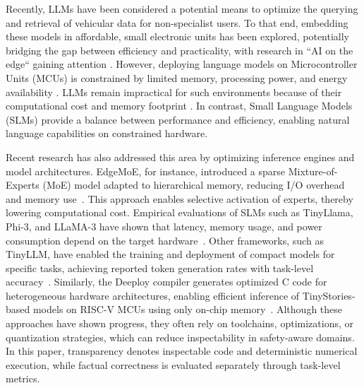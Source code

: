\documentclass{ieeeaccess}
\begin{document}
Recently, LLMs have been considered a potential means to optimize the querying and retrieval of vehicular data for non-specialist users. To that end, embedding these models in affordable, small electronic units has been explored, potentially bridging the gap between efficiency and practicality, with research in ``AI on the edge`` gaining attention \cite{iiot}. However, deploying language models on Microcontroller Units (MCUs) is constrained by limited memory, processing power, and energy availability \cite{wu2021tiny}. LLMs remain impractical for such environments because of their computational cost and memory footprint \cite{strubell2019energy}. In contrast, Small Language Models (SLMs) provide a balance between performance and efficiency, enabling natural language capabilities on constrained hardware.

Recent research has also addressed this area by optimizing inference engines and model architectures. EdgeMoE, for instance, introduced a sparse Mixture-of-Experts (MoE) model adapted to hierarchical memory, reducing I/O overhead and memory use~\cite{yi2025edgemoe}. This approach enables selective activation of experts, thereby lowering computational cost. Empirical evaluations of SLMs such as TinyLlama, Phi-3, and LLaMA-3 have shown that latency, memory usage, and power consumption depend on the target hardware~\cite{islam2024characterizing, qin2025empirical}.
%
Other frameworks, such as TinyLLM, have enabled the training and deployment of compact models for specific tasks, achieving reported token generation rates with task-level accuracy~\cite{10.1145/3636534.3697466}. Similarly, the Deeploy compiler generates optimized C code for heterogeneous hardware architectures, enabling efficient inference of TinyStories-based models on RISC-V MCUs using only on-chip memory~\cite{scherer2024deeploy}. Although these approaches have shown progress, they often rely on toolchains, optimizations, or quantization strategies, which can reduce inspectability in safety-aware domains. In this paper, transparency denotes inspectable code and deterministic numerical execution, while factual correctness is evaluated separately through task-level metrics.
\end{document}
